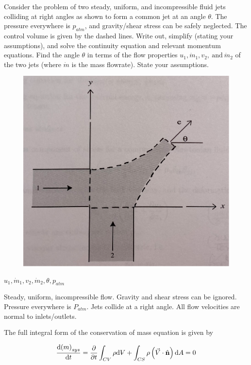 \documentclass[../main.tex]{subfiles}
\begin{document}

Consider the problem of two steady, uniform, and incompressible fluid jets colliding at right angles as shown to form a common jet at an angle \(\theta\). 
The pressure everywhere is \(p_{atm}\), and gravity/shear stress can be safely neglected. 
The control volume is given by the dashed lines.
Write out, simplify (stating your assumptions), and solve the continuity equation and relevant momentum equations. 
Find the angle \(\theta\) in terms of the flow properties \(u_1, \dot{m}_1, v_2, \ \textrm{and} \ \dot{m}_2\) of the two jets (where \(\dot{m}\) is the mass flowrate). 
State your assumptions.

\begin{figure}[ht]
    \centering
    \includegraphics[scale=0.5]{images/problem2_diagram.png}
\end{figure}

\givens{}
\(u_1, \dot{m}_1, v_2, \dot{m}_2, \theta, p_{atm}\)

\assumptions{}
Steady, uniform, incompressible flow. 
Gravity and shear stress can be ignored. 
Pressure everywhere is $P_{atm}$.
Jets collide at a right angle.
All flow velocities are normal to inlets/outlets.

\solution{}
The full integral form of the conservation of mass equation is given by

\begin{equation*}
    \frac{\dd (m)_{sys}}{\dd t} = %
    \pdv{t} \int_{CV} \rho \dd \volume +%
    \int_{CS} \rho \left({\vec{V} \cdot \hat{\mathbf{n}}}\right) \dd A
    = 0
\end{equation*}
\end{document}
